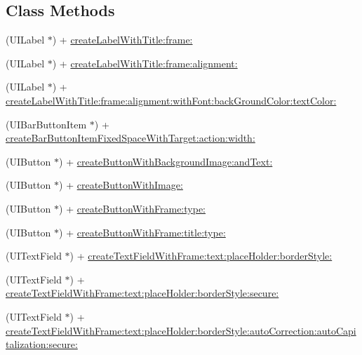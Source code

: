 \subsection*{Class Methods}
\begin{DoxyCompactItemize}
\item 
(U\-I\-Label $\ast$) + \hyperlink{interface_pxe_player_u_i_util_af97dd508a062ea331f21cee822c18ac1}{create\-Label\-With\-Title\-:frame\-:}
\item 
(U\-I\-Label $\ast$) + \hyperlink{interface_pxe_player_u_i_util_aeb918f401925afac57dc304b3293fb9a}{create\-Label\-With\-Title\-:frame\-:alignment\-:}
\item 
(U\-I\-Label $\ast$) + \hyperlink{interface_pxe_player_u_i_util_a23a5563a7da90892b24e091aca290393}{create\-Label\-With\-Title\-:frame\-:alignment\-:with\-Font\-:back\-Ground\-Color\-:text\-Color\-:}
\item 
(U\-I\-Bar\-Button\-Item $\ast$) + \hyperlink{interface_pxe_player_u_i_util_ad917830f6ccb35dd5c109f1697a0fc2b}{create\-Bar\-Button\-Item\-Fixed\-Space\-With\-Target\-:action\-:width\-:}
\item 
(U\-I\-Button $\ast$) + \hyperlink{interface_pxe_player_u_i_util_a6ba382d8495af6d997eb7da8a57bfee0}{create\-Button\-With\-Background\-Image\-:and\-Text\-:}
\item 
(U\-I\-Button $\ast$) + \hyperlink{interface_pxe_player_u_i_util_a54829e9c57be3d689bcb8da8f52ba9d3}{create\-Button\-With\-Image\-:}
\item 
(U\-I\-Button $\ast$) + \hyperlink{interface_pxe_player_u_i_util_afedfe9c0eff74632f51318cfea86840c}{create\-Button\-With\-Frame\-:type\-:}
\item 
(U\-I\-Button $\ast$) + \hyperlink{interface_pxe_player_u_i_util_a385726137b2739f0a1e437b4cacf275b}{create\-Button\-With\-Frame\-:title\-:type\-:}
\item 
(U\-I\-Text\-Field $\ast$) + \hyperlink{interface_pxe_player_u_i_util_a729f6ec35dbdca08068b30fe32d5dc6e}{create\-Text\-Field\-With\-Frame\-:text\-:place\-Holder\-:border\-Style\-:}
\item 
(U\-I\-Text\-Field $\ast$) + \hyperlink{interface_pxe_player_u_i_util_a143f1a5e07d96431e447647b287dc454}{create\-Text\-Field\-With\-Frame\-:text\-:place\-Holder\-:border\-Style\-:secure\-:}
\item 
(U\-I\-Text\-Field $\ast$) + \hyperlink{interface_pxe_player_u_i_util_a86fcafd38ae7f5614668732298ceeaf9}{create\-Text\-Field\-With\-Frame\-:text\-:place\-Holder\-:border\-Style\-:auto\-Correction\-:auto\-Capitalization\-:secure\-:}

\end{DoxyCompactItemize}
